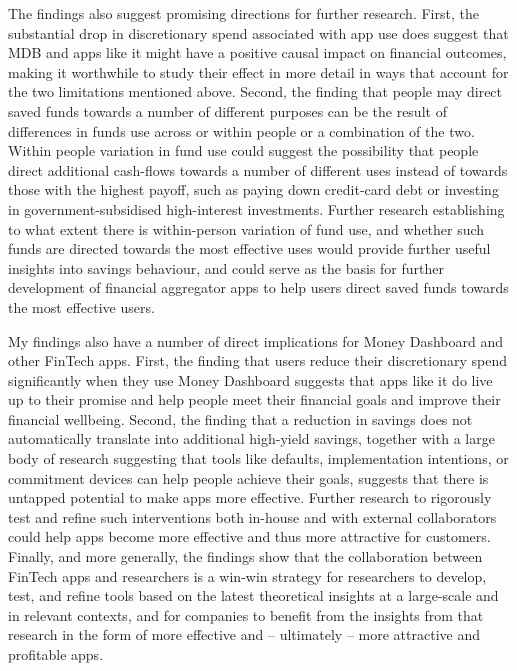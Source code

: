 The findings also suggest promising directions for further research. First, the
substantial drop in discretionary spend associated with app use does suggest
that MDB and apps like it might have a positive causal impact on financial
outcomes, making it worthwhile to study their effect in more detail in ways
that account for the two limitations mentioned above. Second, the finding that
people may direct saved funds towards a number of different purposes can be the
result of differences in funds use across or within people or a combination of
the two. Within people variation in fund use could suggest the possibility that
people direct additional cash-flows towards a number of different uses instead
of towards those with the highest payoff, such as paying down credit-card debt
or investing in government-subsidised high-interest investments. Further
research establishing to what extent there is within-person variation of fund
use, and whether such funds are directed towards the most effective uses would
provide further useful insights into savings behaviour, and could serve as the
basis for further development of financial aggregator apps to help users direct
saved funds towards the most effective users.

My findings also have a number of direct implications for Money Dashboard and
other FinTech apps. First, the finding that users reduce their discretionary
spend significantly when they use Money Dashboard suggests that apps like it do
live up to their promise and help people meet their financial goals and improve
their financial wellbeing. Second, the finding that a reduction in savings does
not automatically translate into additional high-yield savings, together with a
large body of research suggesting that tools like defaults, implementation
intentions, or commitment devices can help people achieve their goals, suggests
that there is untapped potential to make apps more effective. Further research
to rigorously test and refine such interventions both in-house and with
external collaborators could help apps become more effective and thus more
attractive for customers. Finally, and more generally, the findings show that
the collaboration between FinTech apps and researchers is a win-win strategy
for researchers to develop, test, and refine tools based on the latest
theoretical insights at a large-scale and in relevant contexts, and for
companies to benefit from the insights from that research in the form of more
effective and -- ultimately -- more attractive and profitable apps. 

